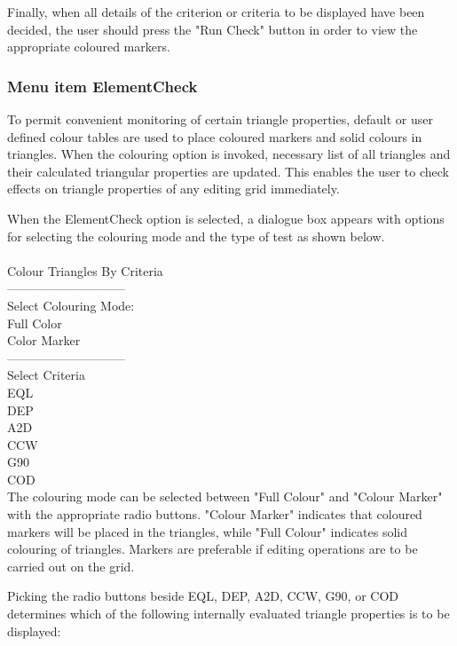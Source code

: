 \documentclass{article}
\begin{document}
Finally, when all details of the criterion or criteria to be displayed have been decided, the user should press the "Run Check" button in order to view the appropriate coloured markers. %

\subsubsection{Menu item ElementCheck}

To permit convenient monitoring of certain triangle properties, default or user defined colour tables are used to place coloured markers and solid colours in triangles. When the colouring option is invoked, necessary list of all triangles and their calculated triangular properties are updated. This enables the user to check effects on triangle properties of any editing grid immediately.

When the ElementCheck option is selected, a dialogue box appears with options for selecting the colouring mode and the type of test as shown below.
\\ 
\\
Colour Triangles By Criteria\\
-----------------------------\\
Select Colouring Mode:\\
\indent	Full Color\\
\indent	Color Marker\\
-----------------------------\\
Select Criteria\\
\indent	EQL\\
\indent	DEP\\
\indent	A2D\\
\indent	CCW \\
\indent	G90\\
\indent	COD\\

The colouring mode can be selected between "Full Colour" and "Colour Marker" with the appropriate radio buttons.  "Colour Marker" indicates that coloured markers will be placed in the triangles, while "Full Colour" indicates solid colouring of triangles. Markers are preferable if editing operations are to be carried out on the grid.

Picking the radio buttons beside EQL, DEP, A2D, CCW, G90, or COD determines which of the following internally evaluated triangle properties is to be displayed:
\end{document}
